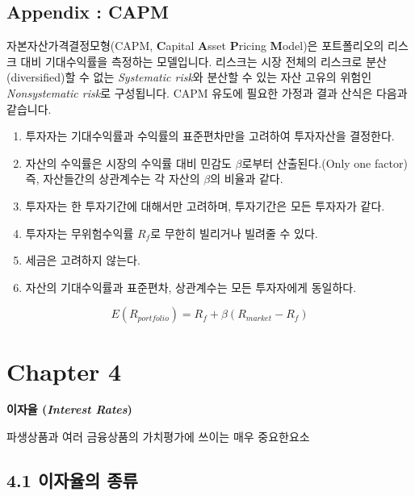\documentclass[
  letterpaper,
  DIV=11,
  numbers=noendperiod]{scrreprt}
\providecommand{\tightlist}{%
  \setlength{\itemsep}{0pt}\setlength{\parskip}{0pt}}\usepackage{longtable,booktabs,array}
\begin{document}
\section*{Appendix : CAPM}\label{sec-CAPM}


자본자산가격결정모형(CAPM, \textbf{C}apital \textbf{A}sset
\textbf{P}ricing \textbf{M}odel)은 포트폴리오의 리스크 대비 기대수익률을
측정하는 모델입니다. 리스크는 시장 전체의 리스크로 분산(diversified)할
수 없는 \emph{Systematic risk}와 분산할 수 있는 자산 고유의 위험인
\emph{Nonsystematic risk}로 구성됩니다. CAPM 유도에 필요한 가정과 결과
산식은 다음과 같습니다.

\begin{enumerate}
\def\labelenumi{\arabic{enumi}.}
\tightlist
\item
  투자자는 기대수익률과 수익률의 표준편차만을 고려하여 투자자산을
  결정한다.
\item
  자산의 수익률은 시장의 수익률 대비 민감도 \(\beta\)로부터
  산출된다.(Only one factor) 즉, 자산들간의 상관계수는 각 자산의
  \(\beta\)의 비율과 같다.
\item
  투자자는 한 투자기간에 대해서만 고려하며, 투자기간은 모든 투자자가
  같다.
\item
  투자자는 무위험수익률 \(R_f\)로 무한히 빌리거나 빌려줄 수 있다.
\item
  세금은 고려하지 않는다.
\item
  자산의 기대수익률과 표준편차, 상관계수는 모든 투자자에게 동일하다.
\end{enumerate}

\[E(R_{portfolio})=R_f+\beta(R_{market}-R_f)\]

\chapter*{Chapter 4}\label{chapter-4}


\textbf{이자율 (\emph{Interest Rates})}

파생상품과 여러 금융상품의 가치평가에 쓰이는 매우 중요한요소

\section*{4.1 이자율의
종류}\label{uxc774uxc790uxc728uxc758-uxc885uxb958}
\end{document}
